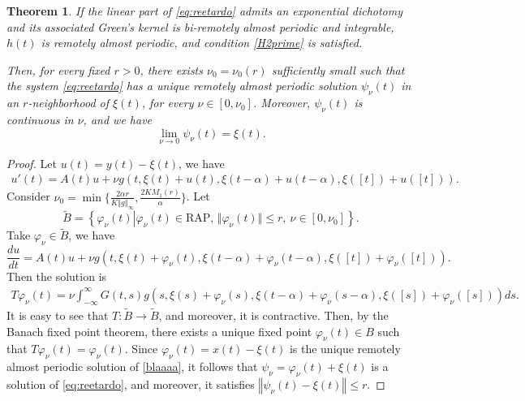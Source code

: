 \documentclass[english,,reqno]{amsart}
\numberwithin{equation}{section}
\theoremstyle{plain}
\newtheorem{thm}{Theorem}[section]
\theoremstyle{definition}
\theoremstyle{remark}
\begin{document}
\begin{thm}
If the linear part of \eqref{eq:reetardo} admits an exponential dichotomy and its associated Green's kernel is bi-remotely almost periodic and integrable,  
$h(t)$ is remotely almost periodic, and condition \ref{H2prime} is satisfied.

Then, for every fixed $r > 0$, there exists $\nu_0 = \nu_0(r)$ sufficiently small such that the system \eqref{eq:reetardo}  
has a unique remotely almost periodic solution $\psi_\nu(t)$ in an $r$-neighborhood of $\xi(t)$,  
for every $\nu \in [0, \nu_0]$.  
Moreover, $\psi_\nu(t)$ is continuous in $\nu$, and we have  
\[
\lim_{\nu \rightarrow 0} \psi_\nu(t) = \xi(t).
\]
\end{thm}
\begin{proof}
Let $u(t)=y(t)-\xi(t)$, we have
\[
\begin{aligned}
 u'(t)	=	A(t)u+\nu g\left(t,\xi(t)+u(t),\xi\left(t-\alpha\right)+u\left(t-\alpha\right),\xi([t])+u([t])\right).
\end{aligned}
\]
Consider $\nu_0=\min\{\frac{2\alpha r}{K\Vert g\Vert_{\infty}},\frac{2KM_1(r)}{\alpha}\}$.
Let
\[
\tilde{B}=\left\{ \varphi_{\nu}\left(t\right)\left|\varphi_{\nu}\left(t\right)\in\mbox{RAP},\,\Vert \varphi_{\nu}\left(t\right)\Vert \leq r,\ \nu\in[0,\nu_0] \right.\right\}.
\] 
Take $\varphi_{\nu}\in\tilde{B}$, we have
\begin{equation}
\frac{du}{dt}=A\left(t\right)u+\nu g\left(t,\xi(t)+\varphi_{\nu}(t),\xi\left(t-\alpha\right)+\varphi_{\nu}\left(t-\alpha\right),\xi([t])+\varphi_\nu([t])\right).\label{blaaaa}
\end{equation}
Then the solution is 
\[
\begin{aligned}
T\varphi_{\nu}(t)=\nu \int_{-\infty}^{\infty} G(t,s)g\left(s,\xi(s)+\varphi_{\nu}(s),\xi\left(t-\alpha\right)+\varphi_{\nu}\left(s-\alpha\right),\xi([s])+\varphi_{\nu}([s])\right)ds.
\end{aligned}
\]
It is easy to see that $T: \tilde{B} \rightarrow \tilde{B}$, and moreover, it is contractive.  
Then, by the Banach fixed point theorem, there exists a unique fixed point $\varphi_\nu(t) \in B$  
such that $T\varphi_\nu(t) = \varphi_\nu(t)$.  
Since $\varphi_\nu(t) = x(t) - \xi(t)$ is the unique remotely almost periodic solution of \eqref{blaaaa},  
it follows that $\psi_\nu = \varphi_\nu(t) + \xi(t)$ is a solution of \eqref{eq:reetardo}, and moreover,  
it satisfies $\left\Vert \psi_\nu(t) - \xi(t) \right\Vert \leq r$.
\end{proof}
\end{document}
